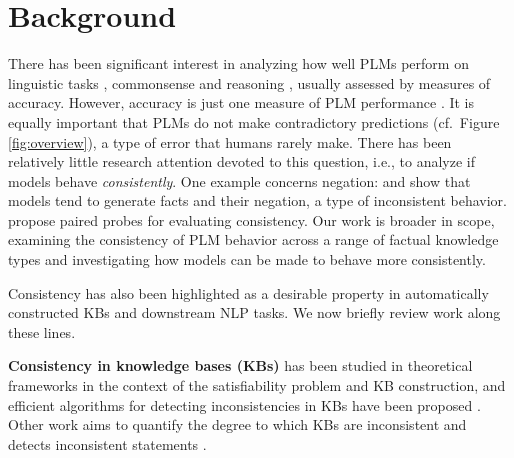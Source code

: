 







\section{Background}
\label{sec:background}
There has been significant interest in analyzing how well
PLMs \cite{rogers2020primer} perform on
linguistic tasks
\cite{yoav-syntax,hewitt2019structural,tenney2019bert,amnesic_probing},
commonsense \cite{forbes2019neural,
  da2019cracking,zhang2020language} and reasoning
\cite{talmor2019olmpics,
  kassner-etal-2020-pretrained}, usually assessed by
measures of accuracy.
However, accuracy is just one measure of PLM performance \cite{linzen2020can}. It is
equally important that PLMs do not make contradictory
predictions (cf.\ Figure \ref{fig:overview}), a type of error that humans rarely make. 
There has been relatively little research attention devoted to this question, i.e., to analyze if models behave \emph{consistently}.
One example concerns negation:
\citet{Ettinger_2020} and \citet{kassner-schutze-2020-negated}
show
that models tend to generate facts and their negation, a
type of inconsistent behavior.
propose paired probes for evaluating consistency.
 Our work is
broader in scope, examining the consistency of PLM behavior across a
range of factual knowledge types and investigating how
models can be made to behave more consistently.


Consistency has also been highlighted as a desirable
property in automatically constructed KBs and downstream NLP
tasks. We now briefly review work along these lines.

\textbf{Consistency in knowledge bases (KBs)} has been
studied in theoretical frameworks in the context of the
satisfiability problem and KB construction, and efficient
algorithms for detecting inconsistencies in KBs have been
proposed \cite{hansen2000probabilistic,andersen2001easy}.
Other work aims to quantify the degree to which KBs are
inconsistent and detects inconsistent statements
\cite{Thimm:2009d,muino2011measuring,Thimm:2013}.



